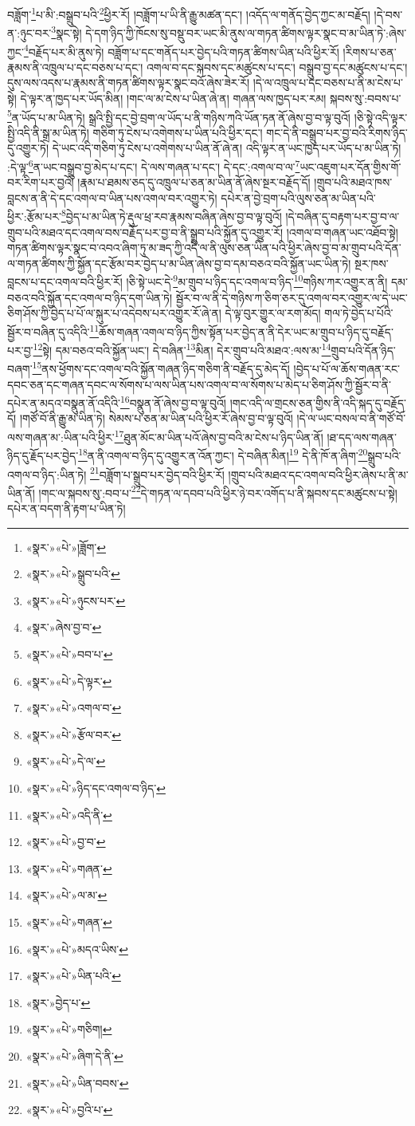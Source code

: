 བཟློག་\footnote{«སྣར་»«པེ་»།ཟློག་}པ་མི་:བསྒྲུབ་པའི་\footnote{«སྣར་»«པེ་»སྒྲུབ་པའི་}ཕྱིར་རོ། །བཟློག་པ་ཡི་ནི་རྒྱུ་མཚན་དང་། །འདོད་ལ་གནོད་བྱེད་ཀྱང་མ་བརྗོད། །དེ་བས་ན་:ཉུང་བར་\footnote{«སྣར་»«པེ་»ཉུངས་པར་}སྣང་སྟེ། དེ་དག་ཉིད་ཀྱི་ཁོངས་སུ་བསྡུ་བར་ཡང་མི་ནུས་ལ་གཏན་ཚིགས་ལྟར་སྣང་བ་མ་ཡིན་ཏེ་:ཞེས་ཀྱང་\footnote{«སྣར་»ཞེས་བྱ་བ་}བརྗོད་པར་མི་ནུས་ཏེ། བཟློག་པ་དང་གནོད་པར་བྱེད་པའི་གཏན་ཚིགས་ཡིན་པའི་ཕྱིར་རོ། །རིགས་པ་ཅན་རྣམས་ནི་འཁྲུལ་པ་དང་བཅས་པ་དང་། འགལ་བ་དང་སྐབས་དང་མཚུངས་པ་དང་། བསྒྲུབ་བྱ་དང་མཚུངས་པ་དང་། དུས་ལས་འདས་པ་རྣམས་ནི་གཏན་ཚིགས་ལྟར་སྣང་བའོ་ཞེས་ཟེར་རོ། །དེ་ལ་འཁྲུལ་པ་དང་བཅས་པ་ནི་མ་ངེས་པ་སྟེ། དེ་ལྟར་ན་ཁྱད་པར་ཡོད་མིན། །གང་ལ་མ་ངེས་པ་ཡིན་ཞེ་ན། གཞན་ལས་ཁྱད་པར་རམ། སྐབས་སུ་:བབས་པ་\footnote{«སྣར་»«པེ་»བབ་པ་}ན་ཡོད་པ་མ་ཡིན་ཏེ། སྒྲའི་སྤྱི་དང་བྱེ་བྲག་ལ་ཡོད་པ་ནི་གཉིས་ཀའི་ཡོན་ཏན་ནོ་ཞེས་བྱ་བ་ལྟ་བུའོ། །ཅི་སྟེ་འདི་ལྟར་སྤྱི་འདི་ནི་སྒྲ་མ་ཡིན་ཏེ། གཅིག་ཏུ་ངེས་པ་འགེགས་པ་ཡིན་པའི་ཕྱིར་དང་། གང་དེ་ནི་བསྒྲུབ་པར་བྱ་བའི་རིགས་ཉིད་དུ་འགྱུར་ཏེ། དེ་ཡང་འདི་གཅིག་ཏུ་ངེས་པ་འགེགས་པ་ཡིན་ནོ་ཞེ་ན། འདི་ལྟར་ན་ཡང་ཁྱད་པར་ཡོད་པ་མ་ཡིན་ཏེ། :དེ་ལྟ་\footnote{«སྣར་»«པེ་»དེ་ལྟར་}ན་ཡང་བསྒྲུབ་བྱ་མེད་པ་དང་། དེ་ལས་གཞན་པ་དང་། དེ་དང་:འགལ་བ་ལ་\footnote{«སྣར་»«པེ་»འགལ་བ་}ཡང་འཇུག་པར་དོན་གྱིས་གོ་བར་རིག་པར་བྱའོ། །རྣམ་པ་ཐམས་ཅད་དུ་འཁྲུལ་པ་ཅན་མ་ཡིན་ནོ་ཞེས་སྔར་བརྗོད་དོ། །གྲུབ་པའི་མཐའ་ཁས་བླངས་ན་ནི་དེ་དང་འགལ་བ་ཡིན་པས་འགལ་བར་འགྱུར་ཏེ། དཔེར་ན་བྱེ་བྲག་པའི་ལུས་ཅན་མ་ཡིན་པའི་ཕྱིར་:རྩོམ་པར་\footnote{«སྣར་»«པེ་»རྩོལ་བར་}བྱེད་པ་མ་ཡིན་ཏེ་རྡུལ་ཕྲ་རབ་རྣམས་བཞིན་ཞེས་བྱ་བ་ལྟ་བུའོ། །དེ་བཞིན་དུ་བརྟག་པར་བྱ་བ་ལ་གྲུབ་པའི་མཐའ་དང་འགལ་བས་བརྗོད་པར་བྱ་བ་ནི་སྒྲུབ་པའི་སྐྱོན་དུ་འགྱུར་རོ། །འགལ་བ་གཞན་ཡང་འཐོབ་སྟེ། གཏན་ཚིགས་ལྟར་སྣང་བ་འབའ་ཞིག་ཏུ་མ་ཟད་ཀྱི་འདི་ལ་ནི་ལུས་ཅན་ཡིན་པའི་ཕྱིར་ཞེས་བྱ་བ་མ་གྲུབ་པའི་དོན་ལ་གཏན་ཚིགས་ཀྱི་སྐྱོན་དང་རྩོམ་བར་བྱེད་པ་མ་ཡིན་ཞེས་བྱ་བ་དམ་བཅའ་བའི་སྐྱོན་ཡང་ཡིན་ཏེ། སྔར་ཁས་བླངས་པ་དང་འགལ་བའི་ཕྱིར་རོ། །ཅི་སྟེ་ཡང་དེ་\footnote{«སྣར་»«པེ་»དེ་ལ་}མ་གྲུབ་པ་ཉིད་དང་འགལ་བ་ཉིད་\footnote{«སྣར་»«པེ་»ཉིད་དང་འགལ་བ་ཉིད་}གཉིས་ཀར་འགྱུར་ན་ནི། དམ་བཅའ་བའི་སྐྱོན་དང་འགལ་བ་ཉིད་དག་ཡིན་ཏེ། སྦྱོར་བ་ལ་ནི་དེ་གཉིས་ཀ་ཅིག་ཅར་དུ་འགལ་བར་འགྱུར་ལ་དེ་ཡང་ཅིག་ཤོས་ཀྱི་བྱེད་པ་པོ་ལ་སྐུར་པ་འདེབས་པར་འགྱུར་རོ་ཞེ་ན། དེ་ལྟ་བུར་གྱུར་ལ་རག་མོད། གལ་ཏེ་བྱེད་པ་པོའི་སྦྱོར་བ་བཞིན་དུ་འདིའི་\footnote{«སྣར་»«པེ་»འདི་ནི་}ཆོས་གཞན་འགལ་བ་ཉིད་ཀྱིས་སྟོན་པར་བྱེད་ན་ནི་དེར་ཡང་མ་གྲུབ་པ་ཉིད་དུ་བརྗོད་པར་བྱ་\footnote{«སྣར་»«པེ་»བྱ་བ་}སྟེ། དམ་བཅའ་བའི་སྐྱོན་ཡང་། དེ་བཞིན་\footnote{«སྣར་»«པེ་»གཞན་}མིན། དེར་གྲུབ་པའི་མཐའ་:ལས་མ་\footnote{«སྣར་»«པེ་»ལ་མ་}གྲུབ་པའི་དོན་ཉིད་བཞག་\footnote{«སྣར་»«པེ་»གཞན་}ནས་ཕྱོགས་དང་འགལ་བའི་སྐྱོན་གཞན་ཉིད་གཅིག་ནི་བརྗོད་དུ་མེད་དོ། །བྱེད་པ་པོ་ལ་ཆོས་གཞན་རང་དབང་ཅན་དང་གཞན་དབང་ལ་སོགས་པ་ལས་ཡིན་པས་འགལ་བ་ལ་སོགས་པ་མེད་པ་ཅིག་ཤོས་ཀྱི་སྦྱོར་བ་ནི་དཔེར་ན་མདའ་བསྣུན་ནོ་འདིའི་\footnote{«སྣར་»«པེ་»མདའ་ཡིས་}བསྣུན་ནོ་ཞེས་བྱ་བ་ལྟ་བུའོ། །གང་འདི་ལ་གྲངས་ཅན་གྱིས་ནི་འདི་སྐད་དུ་བརྗོད་དོ། །གཙོ་བོ་ནི་རྒྱུ་མ་ཡིན་ཏེ། སེམས་པ་ཅན་མ་ཡིན་པའི་ཕྱིར་རོ་ཞེས་བྱ་བ་ལྟ་བུའོ། །དེ་ལ་ཡང་བསལ་བ་ནི་གཙོ་བོ་ལས་གཞན་མ་:ཡིན་པའི་ཕྱིར་\footnote{«སྣར་»«པེ་»ཡིན་པའི་}ཐུན་མོང་མ་ཡིན་པའོ་ཞེས་བྱ་བའི་མ་ངེས་པ་ཉིད་ཡིན་ནོ། །ཐ་དད་ལས་གཞན་ཉིད་དུ་རྗོད་པར་བྱེད་\footnote{«སྣར་»བྱེད་པ་}ན་ནི་འགལ་བ་ཉིད་དུ་འགྱུར་ན་འོན་ཀྱང་། དེ་བཞིན་མིན།\footnote{«སྣར་»«པེ་»གཅིག།} དེ་ནི་ཁོ་ན་ཞིག་\footnote{«སྣར་»«པེ་»ཞིག་དེ་ནི་}སྒྲུབ་པའི་འགལ་བ་ཉིད་:ཡིན་ཏེ། \footnote{«སྣར་»«པེ་»ཡིན་བབས་}བཟློག་པ་སྒྲུབ་པར་བྱེད་བའི་ཕྱིར་རོ། །གྲུབ་པའི་མཐའ་དང་འགལ་བའི་ཕྱིར་ཞེས་པ་ནི་མ་ཡིན་ནོ། །གང་ལ་སྐབས་སུ་:བབ་པ་\footnote{«སྣར་»«པེ་»བྱའི་པ་}དེ་གཏན་ལ་དབབ་པའི་ཕྱིར་ཉེ་བར་འགོད་པ་ནི་སྐབས་དང་མཚུངས་པ་སྟེ། དཔེར་ན་བདག་ནི་རྟག་པ་ཡིན་ཏེ། 